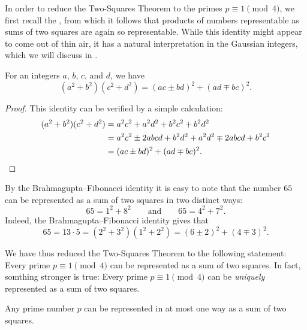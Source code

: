 In order to reduce the Two-Squares Theorem to the primes $p\equiv 1\pmod{4}$, we first recall the , from which it follows that products of numbers representable as sums of two squares are again so representable. While this identity might appear to come out of thin air, it has a natural interpretation in the Gaussian integers, which we will discuss in .

\begin{lemma}
  For an integers $a$, $b$, $c$, and $d$, we have
  \begin{equation*}
    (a^2+b^2)(c^2+d^2) = (ac\pm bd)^2 + (ad \mp bc)^2.
  \end{equation*}
\end{lemma}

\begin{proof}
  This identity can be verified by a simple calculation:
  \begin{align*}
    (a^2+b^2)(c^2+d^2)
    & = a^2c^2+a^2d^2+b^2c^2+b^2d^2\\
    & = a^2c^2 \pm 2abcd+b^2d^2+a^2d^2 \mp 2abcd+b^2c^2\\
    & = (ac \pm bd)^2 + (ad \mp bc)^2.\qedhere
  \end{align*}
\end{proof}

By the Brahmagupta--Fibonacci identity it is easy to note that the number $65$ can be represented as a sum of two squares in two distinct ways:
\begin{equation*}
  65=1^2+8^2\qquad\text{and}\qquad 65=4^2+7^2.
\end{equation*}
Indeed, the Brahmagupta--Fibonacci identity gives that
\begin{equation*}
  65=13\cdot 5=(2^2+3^2)(1^2+2^2)=(6\pm 2)^2 + (4 \mp 3)^2.
\end{equation*}

We have thus reduced the Two-Squares Theorem to the following statement: Every prime $p\equiv 1\pmod{4}$ can be represented as a sum of two squares. In fact, somthing stronger is true: Every prime $p\equiv 1\pmod{4}$ can be \emph{uniquely} represented as a sum of two squares.

\begin{proposition}
  Any prime number $p$ can be represented in at most one way as a sum of two squares.
\end{proposition}

